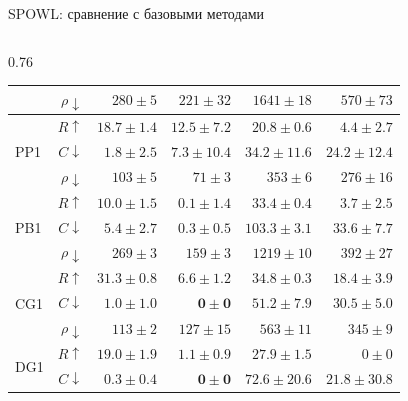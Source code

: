 \begin{frame}[shrink=12]{SPOWL: сравнение с базовыми методами}
\begin{columns}[T,onlytextwidth]
\begin{column}{0.76\textwidth}
{\begin{tabular}{lr|rrrr}
            & \(\rho\downarrow\) & \(280 \pm 5\) & \(221 \pm 32\) & \(1641 \pm 18\) & \(570 \pm 73\) \\
        \midrule
        \multirow{3}{*}{PP1}
            & \cellcolor{yellow!25}\textbf{\(R\uparrow\)} & \cellcolor{yellow!25}\(\mathbf{18.7 \pm 1.4}\) & \cellcolor{yellow!25}\(\mathbf{12.5 \pm 7.2}\) & \(20.8 \pm 0.6\) & \(4.4 \pm 2.7\) \\
            & \cellcolor{green!20}\textbf{\(C\downarrow\)} & \cellcolor{green!20}\(\mathbf{1.8 \pm 2.5}\) & \cellcolor{green!20}\(\mathbf{7.3 \pm 10.4}\) & \(34.2 \pm 11.6\) & \(24.2 \pm 12.4\) \\
            & \(\rho\downarrow\) & \(103 \pm 5\) & \(71 \pm 3\) & \(353 \pm 6\) & \(276 \pm 16\) \\
        \midrule
        \multirow{3}{*}{PB1}
            & \cellcolor{yellow!25}\textbf{\(R\uparrow\)} & \cellcolor{yellow!25}\(\mathbf{10.0 \pm 1.5}\) & \cellcolor{yellow!25}\(\mathbf{0.1 \pm 1.4}\) & \(33.4 \pm 0.4\) & \(3.7 \pm 2.5\) \\
            & \cellcolor{green!20}\textbf{\(C\downarrow\)} & \cellcolor{green!20}\(\mathbf{5.4 \pm 2.7}\) & \cellcolor{green!20}\(\mathbf{0.3 \pm 0.5}\) & \(103.3 \pm 3.1\) & \(33.6 \pm 7.7\) \\
            & \(\rho\downarrow\) & \(269 \pm 3\) & \(159 \pm 3\) & \(1219 \pm 10\) & \(392 \pm 27\) \\
        \midrule
        \multirow{3}{*}{CG1}
            & \cellcolor{yellow!25}\textbf{\(R\uparrow\)} & \cellcolor{yellow!25}\(\mathbf{31.3 \pm 0.8}\) & \cellcolor{yellow!25}\(\mathbf{6.6 \pm 1.2}\) & \(34.8 \pm 0.3\) & \(18.4 \pm 3.9\) \\
            & \cellcolor{green!20}\textbf{\(C\downarrow\)} & \cellcolor{green!20}\(\mathbf{1.0 \pm 1.0}\) & \cellcolor{green!20}\(\mathbf{0 \pm 0}\) & \(51.2 \pm 7.9\) & \(30.5 \pm 5.0\) \\
            & \(\rho\downarrow\) & \(113 \pm 2\) & \(127 \pm 15\) & \(563 \pm 11\) & \(345 \pm 9\) \\
        \midrule
        \multirow{3}{*}{DG1}
            & \cellcolor{yellow!25}\textbf{\(R\uparrow\)} & \cellcolor{yellow!25}\(\mathbf{19.0 \pm 1.9}\) & \cellcolor{yellow!25}\(\mathbf{1.1 \pm 0.9}\) & \(27.9 \pm 1.5\) & \(0 \pm 0\) \\
            & \cellcolor{green!20}\textbf{\(C\downarrow\)} & \cellcolor{green!20}\(\mathbf{0.3 \pm 0.4}\) & \cellcolor{green!20}\(\mathbf{0 \pm 0}\) & \(72.6 \pm 20.6\) & \(21.8 \pm 30.8\) \\

\end{tabular}}
\end{column}
\end{columns}
\end{frame}
